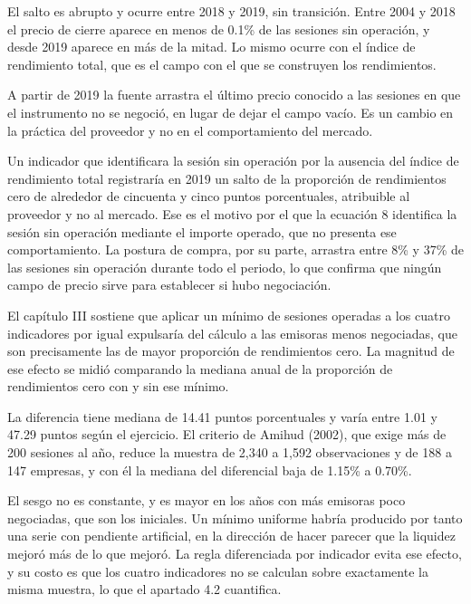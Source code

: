 El salto es abrupto y ocurre entre 2018 y 2019, sin transición. Entre 2004 y 2018 el precio de cierre aparece en menos de 0.1\% de las sesiones sin operación, y desde 2019 aparece en más de la mitad. Lo mismo ocurre con el índice de rendimiento total, que es el campo con el que se construyen los rendimientos.

A partir de 2019 la fuente arrastra el último precio conocido a las sesiones en que el instrumento no se negoció, en lugar de dejar el campo vacío. Es un cambio en la práctica del proveedor y no en el comportamiento del mercado.

Un indicador que identificara la sesión sin operación por la ausencia del índice de rendimiento total registraría en 2019 un salto de la proporción de rendimientos cero de alrededor de cincuenta y cinco puntos porcentuales, atribuible al proveedor y no al mercado. Ese es el motivo por el que la ecuación 8 identifica la sesión sin operación mediante el importe operado, que no presenta ese comportamiento. La postura de compra, por su parte, arrastra entre 8\% y 37\% de las sesiones sin operación durante todo el periodo, lo que confirma que ningún campo de precio sirve para establecer si hubo negociación.


El capítulo III sostiene que aplicar un mínimo de sesiones operadas a los cuatro indicadores por igual expulsaría del cálculo a las emisoras menos negociadas, que son precisamente las de mayor proporción de rendimientos cero. La magnitud de ese efecto se midió comparando la mediana anual de la proporción de rendimientos cero con y sin ese mínimo.

La diferencia tiene mediana de 14.41 puntos porcentuales y varía entre 1.01 y 47.29 puntos según el ejercicio. El criterio de Amihud (2002), que exige más de 200 sesiones al año, reduce la muestra de 2,340 a 1,592 observaciones y de 188 a 147 empresas, y con él la mediana del diferencial baja de 1.15\% a 0.70\%.

El sesgo no es constante, y es mayor en los años con más emisoras poco negociadas, que son los iniciales. Un mínimo uniforme habría producido por tanto una serie con pendiente artificial, en la dirección de hacer parecer que la liquidez mejoró más de lo que mejoró. La regla diferenciada por indicador evita ese efecto, y su costo es que los cuatro indicadores no se calculan sobre exactamente la misma muestra, lo que el apartado 4.2 cuantifica.

